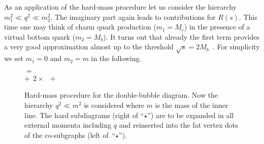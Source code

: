 As an application of the hard-mass procedure let us consider the hierarchy 
$m_1^2\ll q^2\ll m_2^2$. The imaginary part again leads to contributions
for $R(s)$. This time one may think of charm quark production ($m_1=M_c$)
in the presence of a virtual bottom quark ($m_2=M_b$). It turns out that
already the first term provides a very good approximation almost up
to the threshold $\sqrt{s}=2M_b$~\cite{Che93,HoaJezKueTeu94,Teudiss}.
For simplicity we set $m_1=0$ and $m_2=m$ in the following.

\begin{figure}[t]
  \begin{center}
  \leavevmode
   \epsfxsize=3cm
   \hspace{1em}
   \raisebox{2.8em}
   {\Large $=$}
   \hspace{-1em}
   \raisebox{2.8em}{\Large $\ \ \star \!\!$}
   \hspace{0em}\\[1em]
   \mbox{\hspace{1em}}
   \raisebox{2.8em}
   {\Large $+ \ \ 2\times \ $}
   \hspace{0em}
   \raisebox{2.8em}{\Large $\ \ \star \!\!$}
   \raisebox{2.8em}
   {\Large $\!\!\!\!+\ \ $}
   \epsfxsize=3cm
   \raisebox{2.8em}{\Large $\ \ \star \!\!\!\!\!\!$}
   \hspace{0em}
    \parbox{\captionwidth}{
   \caption[]{\label{figdbhmp}\sloppy
     Hard-mass procedure for the double-bubble diagram. Now the
     hierarchy $q^2 \ll m^2$ is considered where $m$ is the mass of the
     inner line.  The hard subdiagrams (right of ``$\star$'') are to be
     expanded in all external momenta including $q$ and reinserted into
     the fat vertex dots of the co-subgraphs (left of~``$\star$'').}}
 \end{center}
\end{figure}

